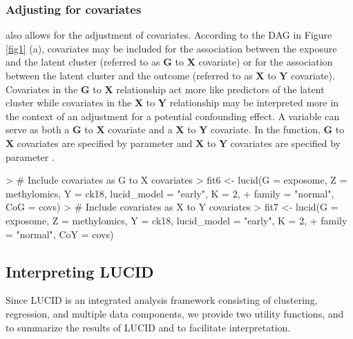 \subsubsection{Adjusting for covariates} \label{sec3.1.3}
 also allows for the adjustment of covariates. According to the DAG in Figure \ref{fig1} (a), covariates may be included for the association between the exposure and the latent cluster (referred to as $\bm G$ to $\bm X$ covariate) or for the association between the latent cluster and the outcome (referred to as $\bm X$ to $\bm Y$ covariate). Covariates in the $\bm G$ to $\bm X$ relationship act more like predictors of the latent cluster while covariates in the $\bm X$ to $\bm Y$ relationship may be interpreted more in the context of an adjustment for a potential confounding effect. A variable can serve as both a $\bm G$ to $\bm X$ covariate and a $\bm X$ to $\bm Y$ covariate. In the  function, $\bm G$ to $\bm X$ covariates are specified by parameter  and $\bm X$ to $\bm Y$ covariates are specified by parameter .
\begin{example}
> # Include covariates as G to X covariates
> fit6 <- lucid(G = exposome, Z = methylomics, Y = ck18, lucid_model = "early", K = 2, 
+               family = "normal", CoG = covs)
> # Include covariates as X to Y covariates
> fit7 <- lucid(G = exposome, Z = methylomics, Y = ck18, lucid_model = "early", K = 2, 
+               family = "normal", CoY = covs)
\end{example}




\subsection{Interpreting LUCID} \label{section3.2}
Since LUCID is an integrated analysis framework consisting of clustering, regression, and multiple data components, we provide two utility functions,  and  to summarize the results of LUCID and to facilitate interpretation.

